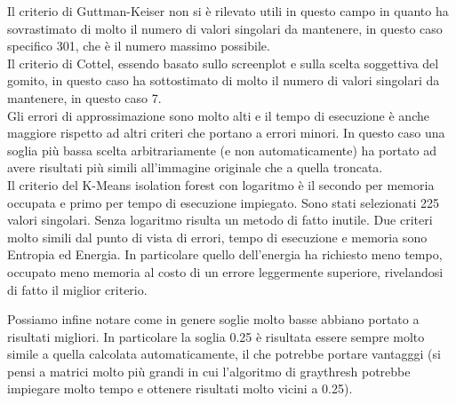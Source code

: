 \noindent Il criterio di Guttman-Keiser non si è rilevato utili in questo campo in quanto ha sovrastimato di molto il numero di valori singolari da mantenere, in questo caso specifico 301, che è il numero massimo possibile.\\
Il criterio di Cottel, essendo basato sullo screenplot e sulla scelta soggettiva del gomito, in questo caso ha sottostimato di molto il numero di valori singolari da mantenere, in questo caso 7.\\
Gli errori di approssimazione sono molto alti e il tempo di esecuzione è anche maggiore rispetto ad altri criteri che portano a errori minori. In questo caso una soglia più bassa scelta arbitrariamente (e non automaticamente) ha portato ad avere risultati più simili all'immagine originale che a quella troncata.\\
Il criterio del K-Means isolation forest con logaritmo è il secondo per memoria occupata e primo per tempo di esecuzione impiegato. Sono stati selezionati 225 valori singolari. Senza logaritmo risulta un metodo di fatto inutile.
Due criteri molto simili dal punto di vista di errori, tempo di esecuzione e memoria sono Entropia ed Energia. In particolare quello dell'energia ha richiesto meno tempo, occupato meno memoria al costo di un errore leggermente superiore, rivelandosi di fatto il miglior criterio.

\noindent Possiamo infine notare come in genere soglie molto basse abbiano portato a risultati migliori. In particolare la soglia 0.25 è risultata essere sempre molto simile a quella calcolata automaticamente, il che potrebbe portare vantagggi (si pensi a matrici molto più grandi in cui l'algoritmo di graythresh potrebbe impiegare molto tempo e ottenere risultati molto vicini a 0.25).\\
